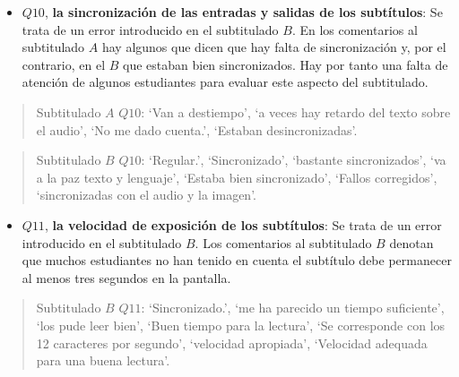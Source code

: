 \documentclass[
  12pt,
  a4paper,
  extrafontsizes,
  onecolumn,
  openright,
  table]{memoir}
\providecommand{\tightlist}{%
  \setlength{\itemsep}{0pt}\setlength{\parskip}{0pt}}\usepackage{longtable,booktabs,array}
\begin{document}
\color{black}
\normalsize

\begin{itemize}
\tightlist
\item
  \(Q10\), \textbf{la sincronización de las entradas y salidas de los
  subtítulos}: Se trata de un error introducido en el subtitulado \(B\).
  En los comentarios al subtitulado \(A\) hay algunos que dicen que hay
  falta de sincronización y, por el contrario, en el \(B\) que estaban
  bien sincronizados. Hay por tanto una falta de atención de algunos
  estudiantes para evaluar este aspecto del subtitulado.
\end{itemize}

\scriptsize
\color{blue}

\begin{quote}
Subtitulado \(A\) \(Q10\): \enquote*{Van a destiempo}, \enquote*{a veces
hay retardo del texto sobre el audio}, \enquote*{No me dado cuenta.},
\enquote*{Estaban desincronizadas}.
\end{quote}

\color{black}
\normalsize

\scriptsize
\color{red}

\begin{quote}
Subtitulado \(B\) \(Q10\): \enquote*{Regular.}, \enquote*{Sincronizado},
\enquote*{bastante sincronizados}, \enquote*{va a la paz texto y
lenguaje}, \enquote*{Estaba bien sincronizado}, \enquote*{Fallos
corregidos}, \enquote*{sincronizadas con el audio y la imagen}.
\end{quote}

\color{black}
\normalsize

\begin{itemize}
\tightlist
\item
  \(Q11\), \textbf{la velocidad de exposición de los subtítulos}: Se
  trata de un error introducido en el subtitulado \(B\). Los comentarios
  al subtitulado \(B\) denotan que muchos estudiantes no han tenido en
  cuenta el subtítulo debe permanecer al menos tres segundos en la
  pantalla.
\end{itemize}

\scriptsize
\color{red}

\begin{quote}
Subtitulado \(B\) \(Q11\): \enquote*{Sincronizado.}, \enquote*{me ha
parecido un tiempo suficiente}, \enquote*{los pude leer bien},
\enquote*{Buen tiempo para la lectura}, \enquote*{Se corresponde con los
12 caracteres por segundo}, \enquote*{velocidad apropiada},
\enquote*{Velocidad adequada para una buena lectura}.
\end{quote}
\end{document}
